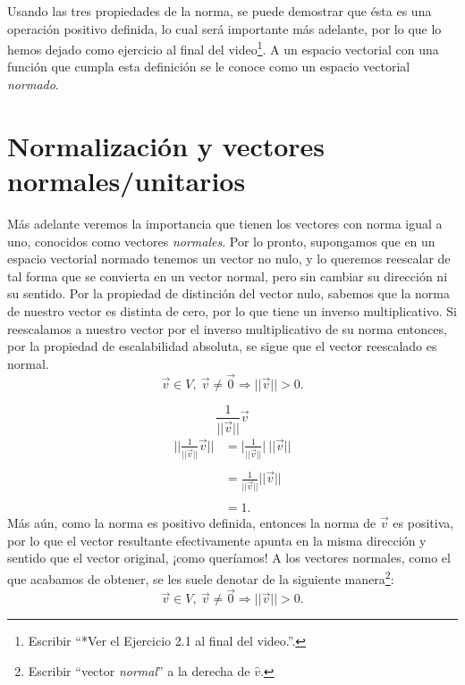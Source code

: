 \documentclass[12pt,dvipsnames]{article}
\numberwithin{equation}{section}
\begin{document}
Usando las tres propiedades de la norma, se puede demostrar que ésta es una operación positivo definida, lo cual será importante más adelante, por lo que lo hemos dejado como ejercicio al final del video\footnote{Escribir ``*Ver el Ejercicio 2.1 al final del video.''.}. A un espacio vectorial con una función que cumpla esta definición se le conoce como un espacio vectorial \emph{normado}.


\section{Normalización y vectores normales/unitarios}

Más adelante veremos la importancia que tienen los vectores con norma igual a uno, conocidos como vectores \emph{normales}. Por lo pronto, supongamos que en un espacio vectorial normado tenemos un vector no nulo, y lo queremos reescalar de tal forma que se convierta en un vector normal, pero sin cambiar su dirección ni su sentido. Por la propiedad de distinción del vector nulo, sabemos que la norma de nuestro vector es distinta de cero, por lo que tiene un inverso multiplicativo. Si reescalamos a nuestro vector por el inverso multiplicativo de su norma entonces, por la propiedad de escalabilidad absoluta, se sigue que el vector reescalado es normal.
\[
    \vec{v}\in V, \ \vec{v}\neq \vec{0} \Rightarrow ||\vec{v}||>0.
\] 

\[
\frac{1}{||\vec{v}||} \vec{v}
\] 
\begin{align*}
                \bigg|\bigg|\frac{1}{||\vec{v}||} \vec{v} \bigg|\bigg| &= \bigg| \frac{1}{||\vec{v}||} \bigg| \ ||\vec{v}|| \\ \\
                                                                       &= \frac{1}{||\vec{v}||} ||\vec{v}|| \\ \\
                                                                       &=1.
\end{align*}
\noindent Más aún, como la norma es positivo definida, entonces la norma de $\vec{v}$ es positiva, por lo que el vector resultante efectivamente apunta en la misma dirección y sentido que el vector original, ¡como queríamos! A los vectores normales, como el que acabamos de obtener, se les suele denotar de la siguiente manera\footnote{Escribir ``vector \emph{normal}'' a la derecha de $\hat{v}$.}: 
\[
    \vec{v}\in V, \ \vec{v}\neq \vec{0} \Rightarrow ||\vec{v}||>0.
\] 
\end{document}

